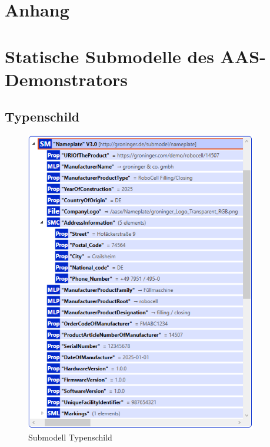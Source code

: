 \section*{Anhang}



\section{Statische Submodelle des AAS-Demonstrators}
\label{sec:AnhangStatischeSubmodelle}
\subsection{Typenschild}
\begin{figure}[H]
    \centering
    \includegraphics[width=0.9\textwidth]{Bilder/ErgebnissePackageExplorer/Typenschild.PNG}
    \caption{Submodell Typenschild}
\end{figure}

